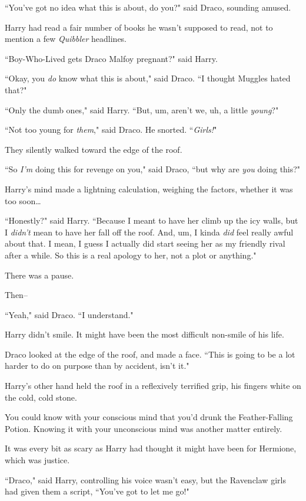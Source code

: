 ``You've got no idea what this is about, do you?" said Draco, sounding amused.

Harry had read a fair number of books he wasn't supposed to read, not to mention a few \emph{Quibbler} headlines.

``Boy-Who-Lived gets Draco Malfoy pregnant?" said Harry.

``Okay, you \emph{do} know what this is about," said Draco. ``I thought Muggles hated that?"

``Only the dumb ones," said Harry. ``But, um, aren't we, uh, a little \emph{young}?"

``Not too young for \emph{them}," said Draco. He snorted. ``\emph{Girls!}"

They silently walked toward the edge of the roof.

``So \emph{I'm} doing this for revenge on you," said Draco, ``but why are \emph{you} doing this?"

Harry's mind made a lightning calculation, weighing the factors, whether it was too soon{\ldots}

``Honestly?" said Harry. ``Because I meant to have her climb up the icy walls, but I \emph{didn't} mean to have her fall off the roof. And, um, I kinda \emph{did} feel really awful about that. I mean, I guess I actually did start seeing her as my friendly rival after a while. So this is a real apology to her, not a plot or anything."

There was a pause.

Then\---

``Yeah," said Draco. ``I understand."

Harry didn't smile. It might have been the most difficult non-smile of his life.

Draco looked at the edge of the roof, and made a face. ``This is going to be a lot harder to do on purpose than by accident, isn't it."

\later

Harry's other hand held the roof in a reflexively terrified grip, his fingers white on the cold, cold stone.

You could know with your conscious mind that you'd drunk the Feather-Falling Potion. Knowing it with your unconscious mind was another matter entirely.

It was every bit as scary as Harry had thought it might have been for Hermione, which was justice.

``Draco," said Harry, controlling his voice wasn't easy, but the Ravenclaw girls had given them a script, ``You've got to let me go!"

